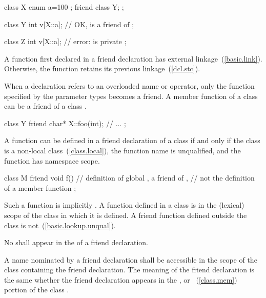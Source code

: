 \begin{codeblock}
class X {
    enum { a=100 };
    friend class Y;
};

class Y {
    int v[X::a];		// OK,  is a friend of 
};

class Z {
    int v[X::a];		// error:  is private
};
\end{codeblock}
\exitexampleb

\pnum
{}%
A function first declared in a friend declaration
has external linkage~(\ref{basic.link}).
Otherwise, the function retains its previous linkage~(\ref{dcl.stc}).

\pnum
{}%
When a
declaration refers to an overloaded name or operator, only the function specified
by the parameter types becomes a friend.
A member function of a class
can be a friend of
a class
.
%
\enterexample

\begin{codeblock}
class Y {
    friend char* X::foo(int);
    // ...
};
\end{codeblock}
\exitexampleb

\pnum
{}%
A function can be defined in a friend declaration of a class if and only if the
class is a non-local class~(\ref{class.local}), the function name is unqualified,
and the function has namespace scope.
\enterexample

\begin{codeblock}
class M {
	friend void f() { }     // definition of global , a friend of ,
                                // not the definition of a member function
};
\end{codeblock}
\exitexampleb
Such a function is implicitly
.
A
function defined in a class is in the (lexical) scope of the class in which it is defined.
A friend function defined outside the class is not~(\ref{basic.lookup.unqual}).

\pnum
No
shall appear in the
of a friend declaration.

\pnum
{}%
A name nominated by a friend declaration shall be accessible in the scope of the
class containing the friend declaration.
The meaning of the friend declaration is the same whether the friend declaration
appears in the
,
or
~(\ref{class.mem})
portion of the class
.

